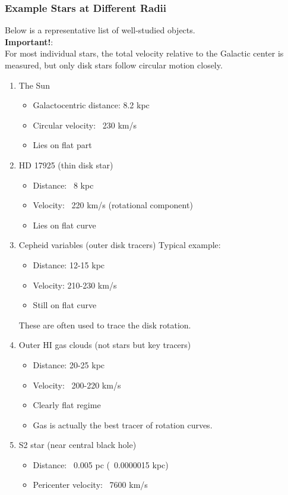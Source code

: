 \documentclass[14pt,a4paper]{article}
\begin{document}
\subsubsection{Example Stars at Different Radii}
Below is a representative list of well-studied objects.\\
\textbf{Important!}:\\
For most individual stars, the total velocity relative to the Galactic center is measured, but only disk stars follow circular motion closely.
\begin{enumerate}
\item The Sun
\begin{itemize}
\item Galactocentric distance: 8.2 kpc
\item Circular velocity: ~230 km/s
\item Lies on flat part
\end{itemize}
\item HD 17925 (thin disk star)
\begin{itemize}
\item Distance: ~8 kpc
\item Velocity: ~220 km/s (rotational component)
\item Lies on flat curve
\end{itemize}
\item Cepheid variables (outer disk tracers)
Typical example:
\begin{itemize}
\item Distance: 12-15 kpc
\item Velocity: 210-230 km/s
\item Still on flat curve
\end{itemize}
These are often used to trace the disk rotation.
\item Outer HI gas clouds (not stars but key tracers)
\begin{itemize}
\item Distance: 20-25 kpc
\item Velocity: ~200-220 km/s
\item Clearly flat regime
\item Gas is actually the best tracer of rotation curves.
\end{itemize}
\item S2 star (near central black hole)
\begin{itemize}
\item Distance: ~0.005 pc (~0.0000015 kpc)
\item Pericenter velocity: ~7600 km/s

\end{itemize}
\end{enumerate}
\end{document}
